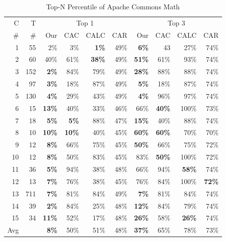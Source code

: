 \begin{table}
\scriptsize
	\centering
	\caption{Top-N Percentile of Apache Commons Math}
	\label{tab:math}	
	
	\begin{tabular}{r|r||r|r|r|r||r|r|r|r}
	\hline
C &T & \multicolumn{4}{c||}{Top 1} & \multicolumn{4}{c}{Top 3} 
\\  \cline{3-10}
\#  & \#   & Our & CAC & CALC & CAR &  Our & CAC & CALC & CAR\\\hline
	1 & 55 & 2\% & 3\%& \textbf{1\%} & 49\% & \textbf{6\%} & 43 & 27\%& 74\%\\
	2 & 60     & 40\%& 61\%& \textbf{38\%} & 49\% & \textbf{51\%} & 61\% & 93\% & 74\%\\
	3 & 152     & \textbf{2\%} & 84\%& 79\%& 49\%  & \textbf{28\%} & 88\% & 88\% & 74\% \\
	4 & 97      & \textbf{3\%} & 18\%& 87\% &  49\%  & \textbf{5\%} & 18\% & 87\% & 74\% \\
	5 & 130    & \textbf{4\%} & 29\% & 43\% & 49\% & \textbf{4\%} & 96\% & 97\% & 74\%  \\
	6 & 15     & \textbf{13\%} & 40\%& 33\%&46\% & 66\% & \textbf{40\%} & 100\% &  73\% \\
	7 & 18      & \textbf{5\%} & \textbf{5\%} & 88\% & 47\% & \textbf{15\%} & 40\% & 88\% & 74\%\\
	8 & 10     & \textbf{10\%} & \textbf{10\%} & 40\% &45\%  & \textbf{60\%} & \textbf{60\%} & 70\%& 70\%\\
	9 & 12     & \textbf{8\%} & 66\%&75\% & 45\% & \textbf{50\%} &66\% & 75\%& 72\%\\
	10 & 12      & \textbf{8\%} & 50\% & 83\% & 45\% & 83\% & \textbf{50\%} & 100\% & 72\% \\
	11 & 36      & \textbf{5\%} & 94\%& 38\% & 48\% & 66\% & 94\%& \textbf{58\%} & 74\%\\
	12 & 13     & \textbf{7\%} & 76\% & 38\%& 45\% & 76\% & 84\%& 100\%& \textbf{72\%} \\
	
	13 & 711    & \textbf{7\%} & 81\%& 84\% & 49\% & \textbf{7\%} & 81\%& 84\%& 74\% \\
	14 & 39      & \textbf{2\%} & 84\%& 25\%& 48\% & \textbf{12\%} & 84\% & 79\% & 74\% \\
	15 & 34      & \textbf{11\%} & 52\% & 17\% & 48\% & \textbf{26\%} & 58\%& \textbf{26\%} & 74\%\\ \hline
	Avg      &   & \textbf{8\%} & 50\% & 51\% & 48\%  & \textbf{37\%} & 65\% & 78\% & 73\% \\  \hline
	\end{tabular}
\end{table} 


